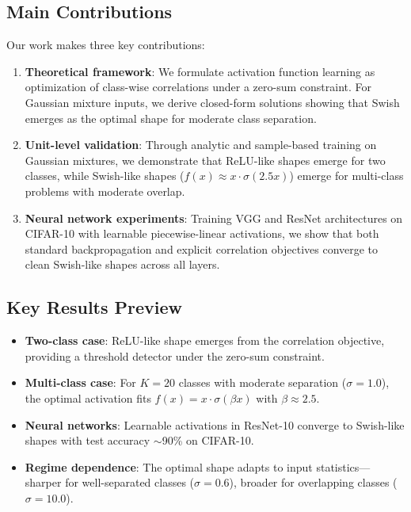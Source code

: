 \documentclass{article}
\begin{document}
\subsection{Main Contributions}

Our work makes three key contributions:

\begin{enumerate}
\item \textbf{Theoretical framework}: We formulate activation function learning as optimization of class-wise correlations under a zero-sum constraint. For Gaussian mixture inputs, we derive closed-form solutions showing that Swish emerges as the optimal shape for moderate class separation.

\item \textbf{Unit-level validation}: Through analytic and sample-based training on Gaussian mixtures, we demonstrate that ReLU-like shapes emerge for two classes, while Swish-like shapes ($f(x) \approx x \cdot \sigma(2.5x)$) emerge for multi-class problems with moderate overlap.

\item \textbf{Neural network experiments}: Training VGG and ResNet architectures on CIFAR-10 with learnable piecewise-linear activations, we show that both standard backpropagation and explicit correlation objectives converge to clean Swish-like shapes across all layers.
\end{enumerate}

\subsection{Key Results Preview}

\begin{itemize}
\item \textbf{Two-class case}: ReLU-like shape emerges from the correlation objective, providing a threshold detector under the zero-sum constraint.
\item \textbf{Multi-class case}: For $K=20$ classes with moderate separation ($\sigma=1.0$), the optimal activation fits $f(x) = x \cdot \sigma(\beta x)$ with $\beta \approx 2.5$.
\item \textbf{Neural networks}: Learnable activations in ResNet-10 converge to Swish-like shapes with test accuracy $\sim$90\% on CIFAR-10.
\item \textbf{Regime dependence}: The optimal shape adapts to input statistics---sharper for well-separated classes ($\sigma=0.6$), broader for overlapping classes ($\sigma=10.0$).
\end{itemize}
\end{document}
